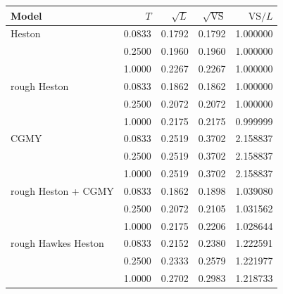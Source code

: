 \begin{tabular}{lrrrr}
\toprule
Model & $T$ & $\sqrt{L}$ & $\sqrt{\mathrm{VS}}$ & $\mathrm{VS}/L$\\
\midrule
Heston & 0.0833 & 0.1792 & 0.1792 & 1.000000\\
 & 0.2500 & 0.1960 & 0.1960 & 1.000000\\
 & 1.0000 & 0.2267 & 0.2267 & 1.000000\\
\addlinespace
rough Heston & 0.0833 & 0.1862 & 0.1862 & 1.000000\\
 & 0.2500 & 0.2072 & 0.2072 & 1.000000\\
 & 1.0000 & 0.2175 & 0.2175 & 0.999999\\
\addlinespace
CGMY & 0.0833 & 0.2519 & 0.3702 & 2.158837\\
 & 0.2500 & 0.2519 & 0.3702 & 2.158837\\
 & 1.0000 & 0.2519 & 0.3702 & 2.158837\\
\addlinespace
rough Heston + CGMY & 0.0833 & 0.1862 & 0.1898 & 1.039080\\
 & 0.2500 & 0.2072 & 0.2105 & 1.031562\\
 & 1.0000 & 0.2175 & 0.2206 & 1.028644\\
\addlinespace
rough Hawkes Heston & 0.0833 & 0.2152 & 0.2380 & 1.222591\\
 & 0.2500 & 0.2333 & 0.2579 & 1.221977\\
 & 1.0000 & 0.2702 & 0.2983 & 1.218733\\
\bottomrule
\end{tabular}
